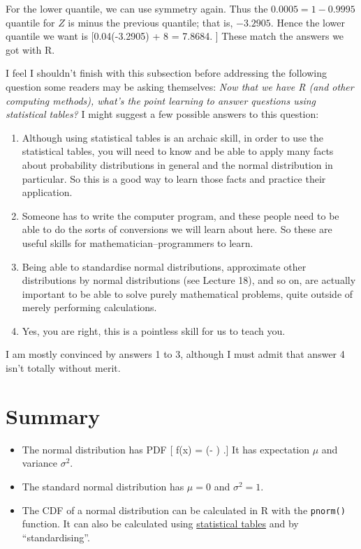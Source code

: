 \documentclass[
  letterpaper,
  DIV=11,
  numbers=noendperiod]{scrreprt}
\providecommand{\tightlist}{%
  \setlength{\itemsep}{0pt}\setlength{\parskip}{0pt}}\usepackage{longtable,booktabs,array}
\theoremstyle{remark}
\begin{document}
For the lower quantile, we can use symmetry again. Thus the
\(0.0005 = 1 - 0.9995\) quantile for \(Z\) is minus the previous
quantile; that is, \(-3.2905\). Hence the lower quantile we want is
{[}0.04\times (-3.2905) + 8 = 7.8684. {]} These match the answers we got
with R.

I feel I shouldn't finish with this subsection before addressing the
following question some readers may be asking themselves: \emph{Now that
we have R (and other computing methods), what's the point learning to
answer questions using statistical tables?} I might suggest a few
possible answers to this question:

\begin{enumerate}
\def\labelenumi{\arabic{enumi}.}
\tightlist
\item
  Although using statistical tables is an archaic skill, in order to use
  the statistical tables, you will need to know and be able to apply
  many facts about probability distributions in general and the normal
  distribution in particular. So this is a good way to learn those facts
  and practice their application.
\item
  Someone has to write the computer program, and these people need to be
  able to do the sorts of conversions we will learn about here. So these
  are useful skills for mathematician--programmers to learn.
\item
  Being able to standardise normal distributions, approximate other
  distributions by normal distributions (see Lecture 18), and so on, are
  actually important to be able to solve purely mathematical problems,
  quite outside of merely performing calculations.
\item
  Yes, you are right, this is a pointless skill for us to teach you.
\end{enumerate}

I am mostly convinced by answers 1 to 3, although I must admit that
answer 4 isn't totally without merit.

\hypertarget{summary-L16}{%
\section*{Summary}\label{summary-L16}}


\begin{itemize}
\tightlist
\item
  The normal distribution has PDF {[} f(x) =
   \exp \left(-
   \right) .{]} It has expectation \(\mu\)
  and variance \(\sigma^2\).
\item
  The standard normal distribution has \(\mu = 0\) and \(\sigma^2 = 1\).
\item
  The CDF of a normal distribution can be calculated in R with the
  \texttt{pnorm()} function. It can also be calculated using
  \href{https://mpaldridge.github.io/math1710/stat-tab.pdf}{statistical
  tables} and by ``standardising''.
\end{itemize}
\end{document}

